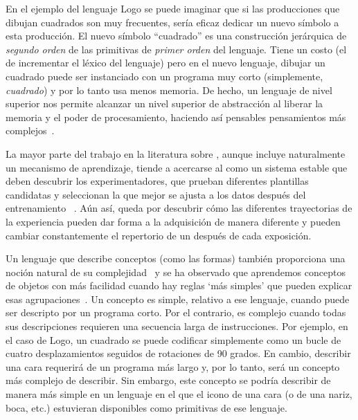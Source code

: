En el ejemplo del lenguaje Logo se puede imaginar que si las producciones que dibujan cuadrados son muy frecuentes, sería eficaz dedicar un nuevo símbolo a esta producción. El nuevo símbolo ``cuadrado'' es una construcción jerárquica de {\em segundo orden} de las primitivas de {\em primer orden} del lenguaje. Tiene un costo (el de incrementar el léxico del lenguaje) pero en el nuevo lenguaje, dibujar un cuadrado puede ser instanciado con un programa muy corto (simplemente, {\em cuadrado}) y por lo tanto usa menos memoria. De hecho, un lenguaje de nivel superior nos permite alcanzar un nivel superior de abstracción al liberar la memoria y el poder de procesamiento, haciendo así pensables pensamientos más complejos~\cite{minsky1967computation, murphy1988comprehending}.

La mayor parte del trabajo en la literatura sobre \lot, aunque incluye naturalmente un mecanismo de aprendizaje, tiende a acercarse al \lot como un sistema estable que deben descubrir los experimentadores, que prueban diferentes plantillas candidatas y seleccionan la que mejor se ajusta a los datos después del entrenamiento ~\cite{goodman2008rational, kemp2012exploring, piantadosi2016logical}. Aún así, queda por descubrir cómo las diferentes trayectorias de la experiencia pueden dar forma a la adquisición de manera diferente y pueden cambiar constantemente el repertorio de un \lot después de cada exposición.

Un lenguaje que describe conceptos (como las formas) también proporciona una noción natural de su complejidad~\cite{kolmogorov1968three} y se ha observado que aprendemos conceptos de objetos con más facilidad cuando hay reglas `más simples' que pueden explicar esas agrupaciones~\cite{shepard1961learning, nosofsky1994comparing, rehder2005eyetracking, lewandowsky2011working, feldman2000minimization, blair2003easy, minda2001prototypes}. Un concepto es simple, relativo a ese lenguaje, cuando puede ser descripto por un programa corto. Por el contrario, es complejo cuando todas sus descripciones requieren una secuencia larga de instrucciones. Por ejemplo, en el caso de Logo, un cuadrado se puede codificar simplemente como un bucle de cuatro desplazamientos seguidos de rotaciones de 90 grados. En cambio, describir una cara requerirá de un programa más largo y, por lo tanto, será un concepto más complejo de describir. Sin embargo, este concepto se podría describir de manera más simple en un lenguaje en el que el icono de una cara (o de una nariz, boca, etc.) estuvieran disponibles como primitivas de ese lenguaje. 

